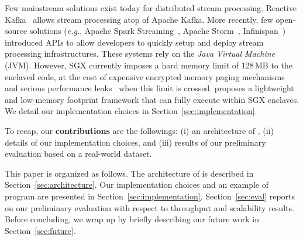 Few mainstream solutions exist today for distributed stream processing.
Reactive Kafka~\cite{reactivekafka} allows stream processing atop of Apache Kafka.
More recently, few open-source solutions (\emph{e.g.}, Apache Spark Streaming~\cite{apachesparkstreaming}, Apache Storm~\cite{apachestorm}, Infinispan~\cite{infinispan}) introduced APIs to allow developers to quickly setup and deploy stream processing infrastructures.
These systems rely on the \emph{Java Virtual Machine} (JVM).
However, SGX currently imposes a hard memory limit of 128\,MB to the enclaved code, at the cost of expensive encrypted memory paging mechanisms and serious performance leaks~\cite{brenner_securekeeper:_2016} when this limit is crossed.
\SYS{} proposes a lightweight and low-memory footprint framework that can fully execute within SGX enclaves.
We detail our implementation choices in Section~\ref{sec:implementation}.

To recap, our \textbf{contributions} are the followings: (i) an architecture of \SYS{}, (ii) details of our implementation choices, and (iii) results of our preliminary evaluation based on a real-world dataset.

This paper is organized as follows.
The architecture of \SYS{} is described in Section~\ref{sec:architecture}.
Our implementation choices and an example of \SYS{} program are presented in Section~\ref{sec:implementation}.
Section~\ref{sec:eval} reports on our preliminary evaluation with respect to throughput and scalability results.
Before concluding, we wrap up by briefly describing our future work in Section~\ref{sec:future}.
